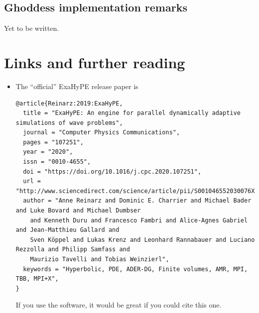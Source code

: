 \subsection{Ghoddess implementation remarks}

\begin{remark}
 Yet to be written.
\end{remark}


\section*{Links and further reading}

\begin{itemize}
  \item The ``official'' ExaHyPE release paper is
{\tiny \begin{verbatim}
@article{Reinarz:2019:ExaHyPE,   
  title = "ExaHyPE: An engine for parallel dynamically adaptive simulations of wave problems",
  journal = "Computer Physics Communications",
  pages = "107251",
  year = "2020",
  issn = "0010-4655",
  doi = "https://doi.org/10.1016/j.cpc.2020.107251",
  url = "http://www.sciencedirect.com/science/article/pii/S001046552030076X",
  author = "Anne Reinarz and Dominic E. Charrier and Michael Bader and Luke Bovard and Michael Dumbser 
    and Kenneth Duru and Francesco Fambri and Alice-Agnes Gabriel and Jean-Matthieu Gallard and 
    Sven Köppel and Lukas Krenz and Leonhard Rannabauer and Luciano Rezzolla and Philipp Samfass and 
    Maurizio Tavelli and Tobias Weinzierl",
  keywords = "Hyperbolic, PDE, ADER-DG, Finite volumes, AMR, MPI, TBB, MPI+X",
}
  \end{verbatim}}
  If you use the software, it would be great if you could cite this one.
\end{itemize}

